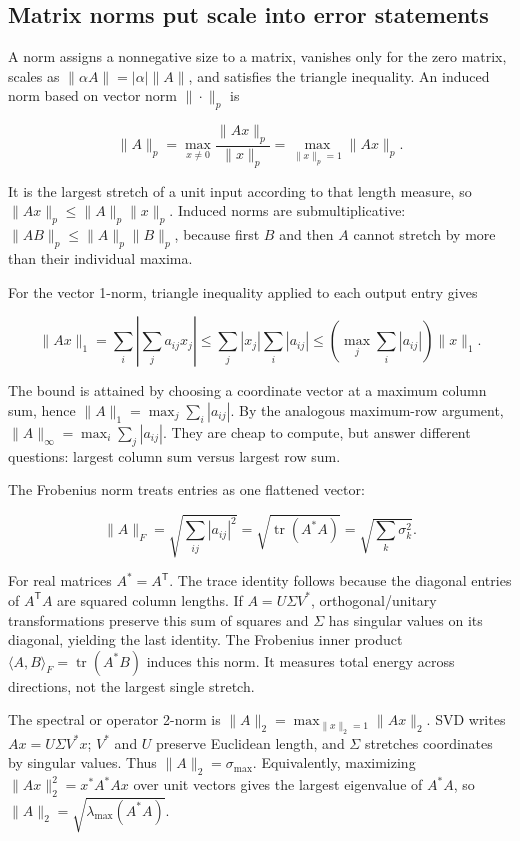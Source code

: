 \subsection{Matrix norms put scale into error statements}\label{matrix-norms-put-scale-into-error-statements}

A norm assigns a nonnegative size to a matrix, vanishes only for the zero matrix, scales as \(\|\alpha A\|=|\alpha|\|A\|\), and satisfies the triangle inequality. An induced norm based on vector norm \(\|\cdot\|_p\) is

\[
\|A\|_p=\max_{x\ne0}\frac{\|Ax\|_p}{\|x\|_p}
=\max_{\|x\|_p=1}\|Ax\|_p.
\]

It is the largest stretch of a unit input according to that length measure, so \(\|Ax\|_p\le\|A\|_p\|x\|_p\). Induced norms are submultiplicative: \(\|AB\|_p\le\|A\|_p\|B\|_p\), because first \(B\) and then \(A\) cannot stretch by more than their individual maxima.

For the vector 1-norm, triangle inequality applied to each output entry gives

\[
\|Ax\|_1=\sum_i\left|\sum_j a_{ij}x_j\right|
\le\sum_j |x_j|\sum_i|a_{ij}|
\le \left(\max_j\sum_i|a_{ij}|\right)\|x\|_1.
\]

The bound is attained by choosing a coordinate vector at a maximum column sum, hence \(\|A\|_1=\max_j\sum_i|a_{ij}|\). By the analogous maximum-row argument, \(\|A\|_\infty=\max_i\sum_j|a_{ij}|\). They are cheap to compute, but answer different questions: largest column sum versus largest row sum.

The Frobenius norm treats entries as one flattened vector:

\[
\|A\|_F=\sqrt{\sum_{ij}|a_{ij}|^2}
=\sqrt{\operatorname{tr}(A^*A)}
=\sqrt{\sum_k\sigma_k^2}.
\]

For real matrices \(A^*=A^\mathsf T\). The trace identity follows because the diagonal entries of \(A^\mathsf TA\) are squared column lengths. If \(A=U\Sigma V^*\), orthogonal/unitary transformations preserve this sum of squares and \(\Sigma\) has singular values on its diagonal, yielding the last identity. The Frobenius inner product \(\langle A,B\rangle_F=\operatorname{tr}(A^*B)\) induces this norm. It measures total energy across directions, not the largest single stretch.

The spectral or operator 2-norm is \(\|A\|_2=\max_{\|x\|_2=1}\|Ax\|_2\). SVD writes \(Ax=U\Sigma V^*x\); \(V^*\) and \(U\) preserve Euclidean length, and \(\Sigma\) stretches coordinates by singular values. Thus \(\|A\|_2=\sigma_{\max}\). Equivalently, maximizing \(\|Ax\|_2^2=x^*A^*Ax\) over unit vectors gives the largest eigenvalue of \(A^*A\), so \(\|A\|_2=\sqrt{\lambda_{\max}(A^*A)}\).

